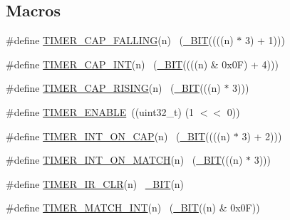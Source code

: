 \subsection*{Macros}
\begin{DoxyCompactItemize}
\item 
\#define \hyperlink{group__TIMER__17XX__40XX_ga92756f0e8a80d645bad91470d46c9993}{T\+I\+M\+E\+R\+\_\+\+C\+A\+P\+\_\+\+F\+A\+L\+L\+I\+NG}(n)    ~(\hyperlink{group__LPC__Types__Public__Macros_ga7ee022f5e5a971a8324e4b7572d49170}{\+\_\+\+B\+IT}((((n) $\ast$ 3) + 1)))
\item 
\#define \hyperlink{group__TIMER__17XX__40XX_ga5c6fdecf8589003b745299d6441091a9}{T\+I\+M\+E\+R\+\_\+\+C\+A\+P\+\_\+\+I\+NT}(n)            ~(\hyperlink{group__LPC__Types__Public__Macros_ga7ee022f5e5a971a8324e4b7572d49170}{\+\_\+\+B\+IT}((((n) \& 0x0\+F) + 4)))
\item 
\#define \hyperlink{group__TIMER__17XX__40XX_ga04f3e8b6288ea815db1515da5bf07187}{T\+I\+M\+E\+R\+\_\+\+C\+A\+P\+\_\+\+R\+I\+S\+I\+NG}(n)      ~(\hyperlink{group__LPC__Types__Public__Macros_ga7ee022f5e5a971a8324e4b7572d49170}{\+\_\+\+B\+IT}(((n) $\ast$ 3)))
\item 
\#define \hyperlink{group__TIMER__17XX__40XX_gace9bc6168bdb15fd3c88da899ad3f154}{T\+I\+M\+E\+R\+\_\+\+E\+N\+A\+B\+LE}~((uint32\+\_\+t) (1 $<$$<$ 0))
\item 
\#define \hyperlink{group__TIMER__17XX__40XX_gabcdc8bb66e431654fa055faab1daf6f1}{T\+I\+M\+E\+R\+\_\+\+I\+N\+T\+\_\+\+O\+N\+\_\+\+C\+AP}(n)      ~(\hyperlink{group__LPC__Types__Public__Macros_ga7ee022f5e5a971a8324e4b7572d49170}{\+\_\+\+B\+IT}((((n) $\ast$ 3) + 2)))
\item 
\#define \hyperlink{group__TIMER__17XX__40XX_gacfe7a83f01c0da36fbd1df5832fa70a1}{T\+I\+M\+E\+R\+\_\+\+I\+N\+T\+\_\+\+O\+N\+\_\+\+M\+A\+T\+CH}(n)  ~(\hyperlink{group__LPC__Types__Public__Macros_ga7ee022f5e5a971a8324e4b7572d49170}{\+\_\+\+B\+IT}(((n) $\ast$ 3)))
\item 
\#define \hyperlink{group__TIMER__17XX__40XX_ga060d4b16b2e2f9d7fc85f10a571a3191}{T\+I\+M\+E\+R\+\_\+\+I\+R\+\_\+\+C\+LR}(n)              ~\hyperlink{group__LPC__Types__Public__Macros_ga7ee022f5e5a971a8324e4b7572d49170}{\+\_\+\+B\+IT}(n)
\item 
\#define \hyperlink{group__TIMER__17XX__40XX_gacf52074dee13a1c9b7187ebbb620cd4f}{T\+I\+M\+E\+R\+\_\+\+M\+A\+T\+C\+H\+\_\+\+I\+NT}(n)        ~(\hyperlink{group__LPC__Types__Public__Macros_ga7ee022f5e5a971a8324e4b7572d49170}{\+\_\+\+B\+IT}((n) \& 0x0\+F))
\item 
$$
\end{DoxyCompactItemize}
